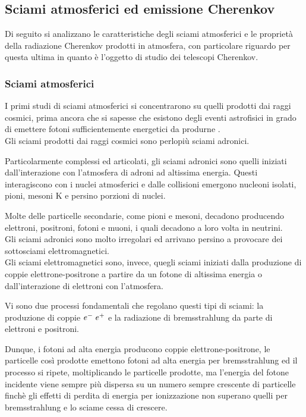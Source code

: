 \documentclass[10pt]{article}
\begin{document}
\subsection{Sciami atmosferici ed emissione Cherenkov}
Di seguito si analizzano le caratteristiche degli sciami atmosferici e le proprietà della radiazione Cherenkov prodotti in atmosfera, con particolare riguardo per questa ultima in quanto è l'oggetto di studio dei telescopi Cherenkov.

\subsubsection{Sciami atmosferici}
I primi studi di sciami atmosferici si concentrarono su quelli prodotti dai raggi cosmici, prima ancora che si sapesse che esistono degli eventi astrofisici in grado di emettere fotoni sufficientemente energetici da produrne \cite{GDVHEGr}.
\\
Gli sciami prodotti dai raggi cosmici sono perlopiù sciami adronici.

Particolarmente complessi ed articolati, gli sciami adronici sono quelli iniziati dall'interazione con l'atmosfera di adroni ad altissima energia. Questi interagiscono con i nuclei atmosferici e dalle collisioni emergono nucleoni isolati, pioni, mesoni K e persino porzioni di nuclei.

Molte delle particelle secondarie, come pioni e mesoni, decadono producendo elettroni, positroni, fotoni e muoni, i quali decadono a loro volta in neutrini.
\\

Gli sciami adronici sono molto irregolari ed arrivano persino a provocare dei sottosciami elettromagnetici.
\\

Gli sciami elettromagnetici sono, invece, quegli sciami iniziati dalla produzione di coppie elettrone-positrone a partire da un fotone di altissima energia o dall'interazione di elettroni con l'atmosfera.

Vi sono due processi fondamentali che regolano questi tipi di sciami: la produzione di coppie $ e^- \hspace{3 pt} e^+ $ e la radiazione di bremsstrahlung da parte di elettroni e positroni.

Dunque, i fotoni ad alta energia producono coppie elettrone-positrone, le particelle così prodotte emettono fotoni ad alta energia per bremsstrahlung ed il processo si ripete, moltiplicando le particelle prodotte, ma l'energia del fotone incidente viene sempre più dispersa su un numero sempre crescente di particelle finchè gli effetti di perdita di energia per ionizzazione non superano quelli per bremsstrahlung e lo sciame cessa di crescere.
\\
\end{document}
